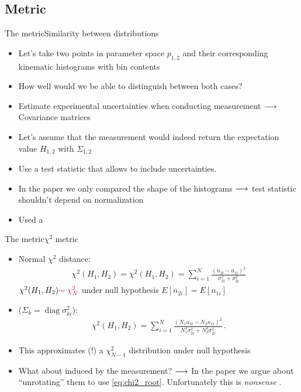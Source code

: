 \subsection{Metric}
\begin{frame}{The metric}{Similarity between distributions}
	\begin{itemize}
		\item Let's take two points in parameter space $p_{1,2}$ and their corresponding kinematic histograms  with bin contents 
		\item How well would we be able to distinguish between both cases?
		\item Estimate experimental uncertainties when conducting measurement  $\longrightarrow$ Covariance matrices  
		\item Let's assume that the measurement would indeed return the expectation value $H_{1,2}$ with $\Sigma_{1,2}$
		\item Use a test statistic that allows to include uncertainties.  
		\item In the paper we only compared the shape of the histograms $\longrightarrow$ test statistic shouldn't depend on normalization
		\item Used a  	
	\end{itemize}
\end{frame}

\begin{frame}{The metric}{$\chi^2$ metric}
	\begin{itemize}
		\item Normal $\chi^2$ distance: 
		\begin{align}
		\chi^2(H_1, H_2) = \chi^2(H_1, H_2) = \sum_{i=1}^N \frac{(n_{2i}-n_{1i})^2}{\sigma_{2i}^2+\sigma_{2i}^2}
		\label{eq:chi2_nonorm}
		\end{align}
		$\chi^2(H_1,H_2){\color{purple}\sim \chi^2_N}$ under null hypothesis $E[n_{2i}]=E[n_{1i}]$
		\item {} ($\Sigma_k = \operatorname{diag}\sigma_{ki}^2$):
		\begin{align}
		  \chi^2(H_1, H_2) = \sum_{i=1}^N \frac{(N_1n_{2i}-N_2n_{1i})^2}{N_1^2\sigma_{2i}^2+N_2^2\sigma_{2i}^2}\,.
		  \label{eq:chi2_root}
		\end{align}
		\item This approximates (!) a $\chi^2_{N-1}$ distribution under null hypothesis 
		\item What about  induced by the measurement? $\longrightarrow$ In the paper we argue about \enquote{unrotating} them to use \eqref{eq:chi2_root}. Unfortunately this is \emph{nonsense} . 
	\end{itemize}
\end{frame}

